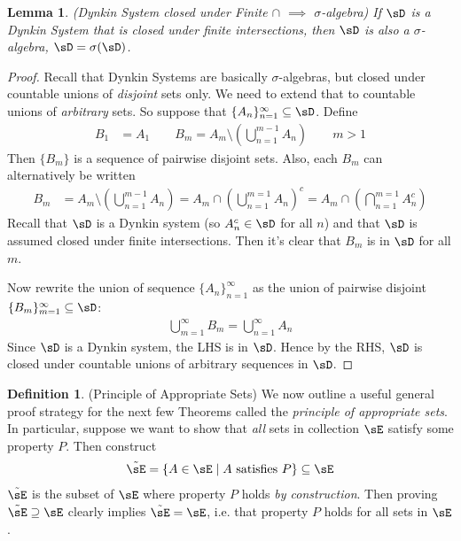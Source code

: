 \documentclass[12pt]{article}
\theoremstyle{plain}
\newtheorem{lem}[thm]{Lemma}
\theoremstyle{definition}
\newtheorem{defn}[thm]{Definition}
\theoremstyle{remark}
\newcommand{\ninf}{_{n=1}^\infty}
\newcommand{\minf}{_{m=1}^\infty}
\begin{document}
\begin{lem}
\label{lem:dynkin-closed}
\emph{(Dynkin System closed under Finite $\cap$ $\implies$ $\sigma$-algebra)}
If $\sD$ is a Dynkin System that is closed under finite intersections,
then $\sD$ is also a $\sigma$-algebra, $\sD=\sigma(\sD)$.
\end{lem}
\begin{proof}
Recall that Dynkin Systems are basically $\sigma$-algebras, but
closed under countable unions of \emph{disjoint} sets only. We need to
extend that to countable unions of \emph{arbitrary} sets. So suppose
that $\{A_n\}\ninf\subseteq \sD$. Define
\begin{align*}
  B_1 &= A_1
  \qquad
  B_m = A_m \setminus \left( \bigcup_{n=1}^{m-1} A_n\right)
  \qquad m>1
\end{align*}
Then $\{B_m\}$ is a sequence of pairwise disjoint sets. Also,
each $B_m$ can alternatively be written
\begin{align*}
  B_m &= A_m \setminus \left( \bigcup_{n=1}^{m-1} A_n\right)
  = A_m \cap \left( \bigcup^{m=1}_{n=1}A_n\right)^c
  = A_m \cap \left( \bigcap^{m=1}_{n=1}A_n^c\right)
\end{align*}
Recall that $\sD$ is a Dynkin system (so $A^c_n\in \sD$ for all $n$) and
that $\sD$ is assumed closed under finite intersections. Then it's clear
that $B_m$ is in $\sD$ for all $m$.

Now rewrite the union of sequence $\{A_n\}\ninf$ as the union of
pairwise disjoint $\{B_m\}_{m=1}^\infty\subseteq\sD$:
\begin{align*}
  \bigcup\minf B_m = \bigcup\ninf A_n
\end{align*}
Since $\sD$ is a Dynkin system, the LHS is in $\sD$. Hence by the RHS,
$\sD$ is closed under countable unions of arbitrary sequences in $\sD$.
\end{proof}

\begin{defn}(Principle of Appropriate Sets)
We now outline a useful general proof strategy for the next few Theorems
called the \emph{principle of appropriate sets}.
In particular, suppose we want to show that \emph{all} sets in
collection $\sE$ satisfy some property $P$.
Then construct
\begin{align*}
  \tilde{\sE}=\{A\in\sE\;|\;\text{$A$ satisfies $P$}\}
  \subseteq \sE
\end{align*}
$\tilde{\sE}$ is the subset of $\sE$ where property $P$ holds
\emph{by construction}.
Then proving $\tilde{\sE}\supseteq \sE$ clearly implies
$\tilde{\sE}=\sE$, i.e. that property $P$ holds for all sets in $\sE$.
\end{defn}
\end{document}
